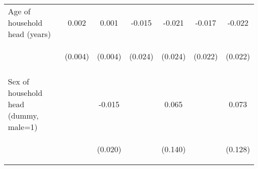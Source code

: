 \begin{center}
\begin{tabular}{lcccccc}
Age of household head (years) & 0.002 & 0.001 & -0.015 & -0.021 & -0.017 & -0.022 \\
 & \begin{footnotesize}(0.004)\end{footnotesize} & \begin{footnotesize}(0.004)\end{footnotesize} & \begin{footnotesize}(0.024)\end{footnotesize} & \begin{footnotesize}(0.024)\end{footnotesize} & \begin{footnotesize}(0.022)\end{footnotesize} & \begin{footnotesize}(0.022)\end{footnotesize} \\
\vspace{4pt} & \begin{footnotesize}[0.639]\end{footnotesize} & \begin{footnotesize}[0.792]\end{footnotesize} & \begin{footnotesize}[0.529]\end{footnotesize} & \begin{footnotesize}[0.390]\end{footnotesize} & \begin{footnotesize}[0.440]\end{footnotesize} & \begin{footnotesize}[0.316]\end{footnotesize} \\
Sex of household head (dummy, male=1) &  & -0.015 &  & 0.065 &  & 0.073 \\
 & \begin{footnotesize}\end{footnotesize} & \begin{footnotesize}(0.020)\end{footnotesize} & \begin{footnotesize}\end{footnotesize} & \begin{footnotesize}(0.140)\end{footnotesize} & \begin{footnotesize}\end{footnotesize} & \begin{footnotesize}(0.128)\end{footnotesize} \\

\end{tabular}
\end{center}
